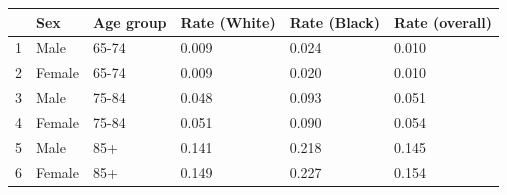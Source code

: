 \begin{table}[ht]
\centering
\begin{tabular}{rlllll}
  \hline
 & Sex & Age group & Rate (White) & Rate (Black) & Rate (overall) \\ 
  \hline
1 & Male & 65-74 & 0.009 & 0.024 & 0.010 \\ 
  2 & Female & 65-74 & 0.009 & 0.020 & 0.010 \\ 
  3 & Male & 75-84 & 0.048 & 0.093 & 0.051 \\ 
  4 & Female & 75-84 & 0.051 & 0.090 & 0.054 \\ 
  5 & Male & 85+ & 0.141 & 0.218 & 0.145 \\ 
  6 & Female & 85+ & 0.149 & 0.227 & 0.154 \\ 
   \hline
\end{tabular}
\end{table}

